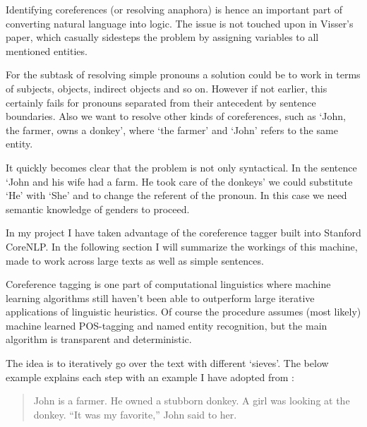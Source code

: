 \documentclass[12pt]{article}
\begin{document}
Identifying coreferences (or resolving anaphora) is hence an important part of converting natural language into logic. The issue is not touched upon in Visser's paper, which casually sidesteps the problem by assigning variables to all mentioned entities.

For the subtask of resolving simple pronouns a solution could be to work in terms of subjects, objects, indirect objects and so on. However if not earlier, this certainly fails for pronouns separated from their antecedent by sentence boundaries. Also we want to resolve other kinds of coreferences, such as `John, the farmer, owns a donkey', where `the farmer' and `John' refers to the same entity.

It quickly becomes clear that the problem is not only syntactical. In the sentence `John and his wife had a farm. He took care of the donkeys' we could substitute `He' with `She' and to change the referent of the pronoun. In this case we need semantic knowledge of genders to proceed.

In my project I have taken advantage of the coreference tagger built into Stanford CoreNLP\cite{lee2013deterministic}\cite{lee2011stanford}\cite{raghunathan2010multi}. In the following section I will summarize the workings of this machine, made to work across large texts as well as simple sentences.

Coreference tagging is one part of computational linguistics where machine learning algorithms still haven't been able to outperform large iterative applications of linguistic heuristics. Of course the procedure assumes (most likely) machine learned POS-tagging and named entity recognition, but the main algorithm is transparent and deterministic.

The idea is to iteratively go over the text with different `sieves'. The below example explains each step with an example I have adopted from \cite{lee2013deterministic}:

\begin{quotation}
John is a farmer. He owned a stubborn donkey.
A girl was looking at the donkey.
``It was my favorite,'' John said to her.
\end{quotation}
\end{document}
